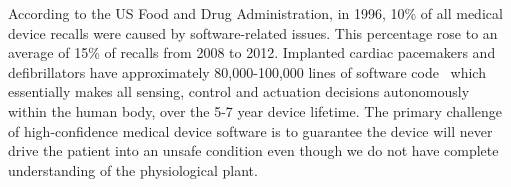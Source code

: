 According to the US Food and Drug Administration, in 1996, 10\% of all medical device recalls were caused by software-related issues. 
This percentage rose to an average of 15\% of recalls from 2008 to 2012. Implanted cardiac pacemakers and defibrillators have approximately 80,000-100,000 lines of software code~\cite{pauljones} which essentially makes all sensing, control and actuation decisions autonomously within the human body, over the 5-7 year device lifetime. The primary challenge of high-confidence medical device software is to guarantee the device will never drive the patient into an unsafe condition even though we do not have complete understanding of the physiological plant. 

